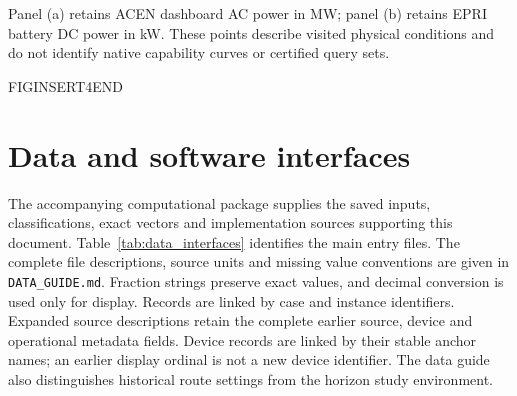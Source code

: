Panel (a) retains ACEN dashboard AC power in MW; panel (b) retains EPRI battery DC power in kW. These points describe visited physical conditions and do not identify native capability curves or certified query sets.

FIGINSERT4END




\section{Data and software interfaces}\label{sec:reproducibility}
The accompanying computational package supplies the saved inputs, classifications,
exact vectors and implementation sources supporting this document. Table~\ref{tab:data_interfaces}
identifies the main entry files. The complete file descriptions, source units
and missing value conventions are given in \texttt{DATA\_GUIDE.md}.
Fraction strings preserve exact values, and decimal conversion is used only
for display. Records are linked by case and instance identifiers.
Expanded source descriptions retain the complete earlier source, device and
operational metadata fields. Device records are linked by their stable anchor
names; an earlier display ordinal is not a new device identifier. The data
guide also distinguishes historical route settings from the horizon study
environment.

